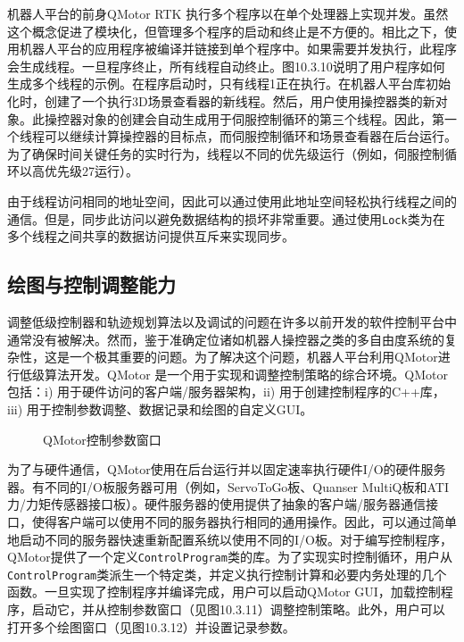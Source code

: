 \documentclass[UTF8,a4paper,12pt]{ctexart}
\begin{document}
机器人平台的前身QMotor RTK \cite{Loffler2001} 执行多个程序以在单个处理器上实现并发。虽然这个概念促进了模块化，但管理多个程序的启动和终止是不方便的。相比之下，使用机器人平台的应用程序被编译并链接到单个程序中。如果需要并发执行，此程序会生成线程。一旦程序终止，所有线程自动终止。图10.3.10说明了用户程序如何生成多个线程的示例。在程序启动时，只有线程1正在执行。在机器人平台库初始化时，创建了一个执行3D场景查看器的新线程。然后，用户使用操控器类的新对象。此操控器对象的创建会自动生成用于伺服控制循环的第三个线程。因此，第一个线程可以继续计算操控器的目标点，而伺服控制循环和场景查看器在后台运行。为了确保时间关键任务的实时行为，线程以不同的优先级运行（例如，伺服控制循环以高优先级27运行）。

由于线程访问相同的地址空间，因此可以通过使用此地址空间轻松执行线程之间的通信。但是，同步此访问以避免数据结构的损坏非常重要。通过使用\texttt{Lock}类为在多个线程之间共享的数据访问提供互斥来实现同步。

\subsection{绘图与控制调整能力}

调整低级控制器和轨迹规划算法以及调试的问题在许多以前开发的软件控制平台中通常没有被解决。然而，鉴于准确定位诸如机器人操控器之类的多自由度系统的复杂性，这是一个极其重要的问题。为了解决这个问题，机器人平台利用QMotor进行低级算法开发。QMotor \cite{Loffler2002} 是一个用于实现和调整控制策略的综合环境。QMotor包括：i) 用于硬件访问的客户端/服务器架构，ii) 用于创建控制程序的C++库，iii) 用于控制参数调整、数据记录和绘图的自定义GUI。

\begin{figure}[htbp]
\centering
{}
\caption{QMotor控制参数窗口}
\label{fig:10.3.11}
\end{figure}

为了与硬件通信，QMotor使用在后台运行并以固定速率执行硬件I/O的硬件服务器。有不同的I/O板服务器可用（例如，ServoToGo板、Quanser MultiQ板和ATI力/力矩传感器接口板）。硬件服务器的使用提供了抽象的客户端/服务器通信接口，使得客户端可以使用不同的服务器执行相同的通用操作。因此，可以通过简单地启动不同的服务器快速重新配置系统以使用不同的I/O板。对于编写控制程序，QMotor提供了一个定义\texttt{ControlProgram}类的库。为了实现实时控制循环，用户从\texttt{ControlProgram}类派生一个特定类，并定义执行控制计算和必要内务处理的几个函数。一旦实现了控制程序并编译完成，用户可以启动QMotor GUI，加载控制程序，启动它，并从控制参数窗口（见图10.3.11）调整控制策略。此外，用户可以打开多个绘图窗口（见图10.3.12）并设置记录参数。
\end{document}
